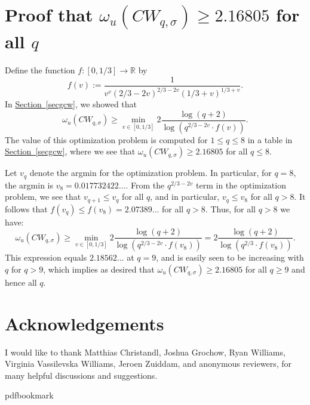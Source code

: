 \documentclass[11pt]{article}
\numberwithin{equation}{section}
\theoremstyle{definition}
\theoremstyle{plain}
\newcommand{\R}{\mathbb R}
\newcommand{\expref}[2]{\hyperref[#2]{#1~\ref{#2}}}
\theoremstyle{definition}
\begin{document}
\appendix
\section{Proof that $\omega_u(CW_{q,\sigma}) \geq 2.16805$ for all $q$} \label{appone}

Define the function $f : [0,1/3] \to \R$ by
$$f(v) := \frac{1}{v^v (2/3 - 2v)^{2/3 - 2v} (1/3 + v)^{1/3+v}}.$$
In \expref{Section}{secgcw}, we showed that $$\omega_u(CW_{q,\sigma}) \geq \min_{v \in [0,1/3]} 2\frac{\log(q+2) }{ \log(q^{2/3 - 2v} \cdot f(v))}.$$
The value of this optimization problem is computed for $1 \leq q \leq 8$ in a table in \expref{Section}{secgcw}, where we see that $\omega_u(CW_{q,\sigma}) \geq 2.16805$ for all $q \leq 8$.

Let $v_q$ denote the argmin for the optimization problem. In particular, for $q=8$, the argmin is $v_8  = 0.017732422\ldots$. {}From the $q^{2/3 - 2v}$ term in the optimization problem, we see that $v_{q+1} \leq v_q$ for all $q$, and in particular, $v_q \leq v_8$ for all $q > 8$. It follows that $f(v_q) \leq f(v_8) = 2.07389\ldots$ for all $q>8$. Thus, for all $q>8$ we have:
$$\omega_u(CW_{q,\sigma}) \geq \min_{v \in [0,1/3]} 2\frac{\log(q+2) }{ \log(q^{2/3 - 2v} \cdot f(v_8))} = 2\frac{\log(q+2) }{ \log(q^{2/3} \cdot f(v_8))}.$$
This expression equals $2.18562\ldots$ at $q=9$, and is easily seen to be increasing with $q$ for $q>9$, which implies as desired that  $\omega_u(CW_{q,\sigma}) \geq 2.16805$ for all $q \geq 9$ and hence all $q$.

\section*{Acknowledgements} I would like to thank Matthias Christandl, Joshua Grochow, Ryan Williams, Virginia Vassilevska Williams, Jeroen Zuiddam, and anonymous reviewers, for many helpful discussions and suggestions.






\newcommand{\prelim}{Preliminary version in\ }
\providecommand{\bibhead}[1]{}
\expandafter\ifx\csname pdfbookmark\endcsname\relax%
  \providecommand{\tocrefpdfbookmark}{}
\else\providecommand{\tocrefpdfbookmark}{%
   \hypertarget{tocreferences}{}%
   \pdfbookmark[1]{References}{tocreferences}}%
\fi
\end{document}
